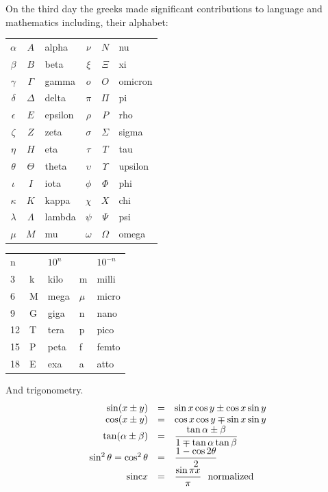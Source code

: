 \documentclass[a4paper,12pt]{article}
\newcommand{\sinc}{{\rm sinc}}
\begin{document}
\begin{multicols}{2}
On the third day the greeks made significant contributions to language and
mathematics including, their alphabet:
\begin{center}
\begin{tabular}{cclccl}
$\alpha $&$ A $& alpha&$\nu $&$ N $& nu\\
$\beta $&$ B $& beta&$\xi$&$\Xi$& xi\\
$\gamma $&$ \Gamma $& gamma&$o $&$ O $& omicron\\
$\delta $&$ \Delta $& delta&$\pi $&$ \Pi $& pi\\
$\epsilon $&$ E $& epsilon&$\rho $&$ P $& rho\\
$\zeta $&$ Z $& zeta&$\sigma $&$ \Sigma $& sigma\\
$\eta $&$ H $& eta&$\tau $&$ T $& tau\\
$\theta $&$ \Theta $& theta&$\upsilon $&$ \Upsilon $&upsilon\\
$\iota $&$ I $& iota&$\phi $&$ \Phi $&phi\\
$\kappa $&$ K $& kappa&$\chi $&$ X $& chi\\
$\lambda $&$ \Lambda $& lambda&$\psi $&$ \Psi $& psi\\
$\mu $&$ M $& mu&$\omega $&$ \Omega $& omega\\
\end{tabular}
\vfill
\begin{tabular}{lllll}
n&& $10^n$&&$10^{-n}$\\
3& k & kilo & m & milli\\
6& M & mega & $\mu$ & micro\\
9& G & giga & n & nano\\
12& T & tera & p & pico\\
15& P & peta & f & femto\\
18& E & exa & a & atto
\end{tabular}
\end{center}
\vfill
\columnbreak
And trigonometry.
\[
\begin{array}{rcl}
\sin(x\pm y)&= &\sin x\cos y \pm \cos x \sin y\\ 
\cos(x\pm y)&= &\cos x \cos y \mp \sin x \sin y\\
\tan(\alpha \pm \beta)&=&\dfrac{\tan\alpha\pm\beta}{1\mp\tan\alpha\tan\beta}\\
\sin^2\theta = \cos^2\theta&=& \dfrac{1-\cos 2\theta}{2}\\
\sinc x&=&\dfrac{\sin\pi x}{\pi} \mbox{ \ normalized}\\
\end{array}
\]
\vfill


\end{multicols}
\end{document}
